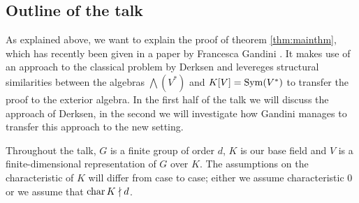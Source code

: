 \documentclass[../main.tex]{subfiles}
\begin{document}
\subsection{Outline of the talk} %
\label{sub:Outline of the talk}
As explained above, we want to explain the proof of theorem \ref{thm:mainthm},
which has recently been given in a paper by Francesca Gandini 
\cite{gandini2021degree}. It makes use of an approach to the classical 
problem by Derksen and levereges structural similarities between the algebras
$\bigwedge(V^*)$ and $K[V] = \operatorname{Sym}(V^*)$ to transfer the proof to the 
exterior algebra. In the first half of the talk we will discuss 
the approach of Derksen, in the second we will investigate how Gandini manages
to transfer this approach to the new setting.

Throughout the talk, $G$ is a finite group of order $d$, $K$ is our base field
and $V$ is a finite-dimensional representation of $G$ over $K$. The assumptions
on the characteristic of $K$ will differ from case to case; either we assume
characteristic $0$ or we assume that $\operatorname{char} K \nmid d$.
\end{document}
